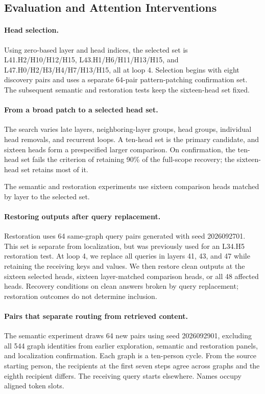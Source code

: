 \documentclass{article}
\begin{document}
\subsection{Evaluation and Attention Interventions}
\label{app:ouro-evaluation}
\paragraph{Head selection.}
Using zero-based layer and head indices, the selected set is L41.H2/H10/H12/H15, L43.H1/H6/H11/H13/H15, and L47.H0/H2/H3/H4/H7/H13/H15, all at loop 4. Selection begins with eight discovery pairs and uses a separate 64-pair pattern-patching confirmation set. The subsequent semantic and restoration tests keep the sixteen-head set fixed.

\paragraph{From a broad patch to a selected head set.}
The search varies late layers, neighboring-layer groups, head groups, individual head removals, and recurrent loops. A ten-head set is the primary candidate, and sixteen heads form a prespecified larger comparison. On confirmation, the ten-head set fails the criterion of retaining 90\% of the full-scope recovery; the sixteen-head set retains most of it.

The semantic and restoration experiments use sixteen comparison heads matched by layer to the selected set.

\paragraph{Restoring outputs after query replacement.}
Restoration uses 64 same-graph query pairs generated with seed 2026092701. This set is separate from localization, but was previously used for an L34.H5 restoration test. At loop 4, we replace all queries in layers 41, 43, and 47 while retaining the receiving keys and values. We then restore clean outputs at the sixteen selected heads, sixteen layer-matched comparison heads, or all 48 affected heads. Recovery conditions on clean answers broken by query replacement; restoration outcomes do not determine inclusion.

\paragraph{Pairs that separate routing from retrieved content.}
The semantic experiment draws 64 new pairs using seed 2026092901, excluding all 544 graph identities from earlier exploration, semantic and restoration panels, and localization confirmation. Each graph is a ten-person cycle. From the source starting person, the recipients at the first seven steps agree across graphs and the eighth recipient differs. The receiving query starts elsewhere. Names occupy aligned token slots.
\end{document}

